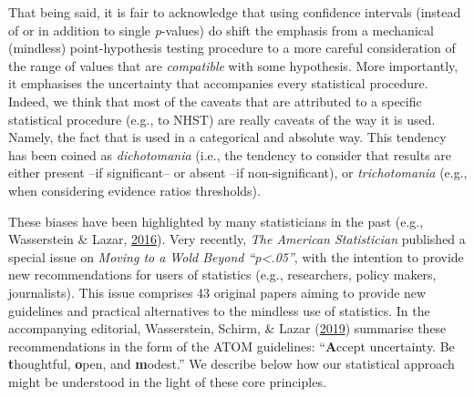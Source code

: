 \documentclass[a4paper,12pt,twoside,openright,oldfontcommands]{memoir}
\begin{document}
That being said, it is fair to acknowledge that using confidence intervals (instead of or in addition to single \emph{p}-values) do shift the emphasis from a mechanical (mindless) point-hypothesis testing procedure to a more careful consideration of the range of values that are \emph{compatible} with some hypothesis. More importantly, it emphasises the uncertainty that accompanies every statistical procedure. Indeed, we think that most of the caveats that are attributed to a specific statistical procedure (e.g., to NHST) are really caveats of the way it is used. Namely, the fact that is used in a categorical and absolute way. This tendency has been coined as \emph{dichotomania} (i.e., the tendency to consider that results are either present --if significant-- or absent --if non-significant), or \emph{trichotomania} (e.g., when considering evidence ratios thresholds).

These biases have been highlighted by many statisticians in the past (e.g., Wasserstein \& Lazar, \protect\hyperlink{ref-wasserstein_asas_2016}{2016}). Very recently, \emph{The American Statistician} published a special issue on \emph{Moving to a Wold Beyond \enquote{p\textless.05}}, with the intention to provide new recommendations for users of statistics (e.g., researchers, policy makers, journalists). This issue comprises 43 original papers aiming to provide new guidelines and practical alternatives to the mindless use of statistics. In the accompanying editorial, Wasserstein, Schirm, \& Lazar (\protect\hyperlink{ref-wasserstein_moving_2019}{2019}) summarise these recommendations in the form of the ATOM guidelines: \enquote{\textbf{A}ccept uncertainty. Be \textbf{t}houghtful, \textbf{o}pen, and \textbf{m}odest.} We describe below how our statistical approach might be understood in the light of these core principles.
\end{document}
